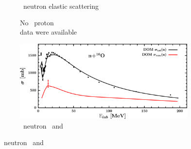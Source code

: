 \begin{figure}[hbtp]
\begin{subfigure}[c]{0.39\textheight}
        \caption{\oSix\ neutron elastic scattering}
        \label{DOMFitData_o16_neutron_elastic}
    \end{subfigure}\vspace{0.70in}
    \begin{subfigure}[c]{0.45\textwidth}
        \centering
        \caption{No \oSix\ proton \rxn\\ data were available}
        \label{DOMFitData_o16_proton_inelastic}
    \end{subfigure}\hspace{6pt}
    \begin{subfigure}[c]{0.45\textwidth}
        \centering
        \includegraphics[width=\linewidth]{figures/o16_neutronInelastic.png}
        \caption{\oSix\ neutron \rxn\ and \tot}
        \label{DOMFitData_o16_neutron_inelastic}
    \end{subfigure}
\end{figure}
\afterpage{\clearpage}
